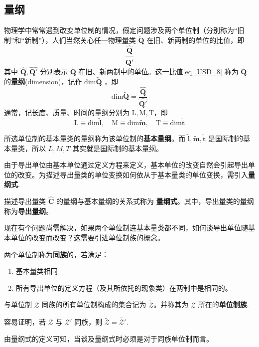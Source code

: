 \subsection{量纲}
物理学中常常遇到改变单位制的情况，假定问题涉及两个单位制（分别称为“旧制”和“新制”），人们当然关心任一物理量类 $\tilde{\boldsymbol{Q}}$ 在旧、新两制的单位的比值，即 
\begin{equation}\label{eq_USD_8}
\frac{\hat{\boldsymbol{Q}}}{\hat{\boldsymbol{Q'}}}
\end{equation}
其中 $\hat{\boldsymbol{Q}},\hat{\boldsymbol{Q'}}$ 分别表示 $\tilde{\boldsymbol{Q}}$ 在旧、新两制中的单位。这一比值\autoref{eq_USD_8} 称为 $\tilde{\boldsymbol{Q}}$ 的\textbf{量纲}(dimension)，记作 $\mathrm{dim}\tilde{\boldsymbol{Q}}$ ，即
\begin{equation}\label{eq_USD_9}
\mathrm{dim}\tilde{\boldsymbol{Q}}=\frac{\hat{\boldsymbol{Q}}}{\hat{\boldsymbol{Q'}}}
\end{equation}
通常，记长度、质量、时间的量纲分别为 $\mathrm{L},\mathrm{M},\mathrm{T}$，即
\begin{equation}
\mathrm{L}\equiv\mathrm{dim}\tilde{\boldsymbol{l}},\quad\mathrm{M}\equiv\mathrm{dim}\tilde{\boldsymbol{m}},\quad
\mathrm{T}\equiv\mathrm{dim}\tilde{\boldsymbol{t}}
\end{equation}

所选单位制的基本量类的量纲称为该单位制的\textbf{基本量纲}。而 $\tilde{\boldsymbol{l}},\tilde{\boldsymbol{m}},\tilde{\boldsymbol{t}}$ 是国际制的基本量类，所以 $L,M,T$ 其实就是国际制的基本量纲。

由于导出单位由基本单位通过定义方程来定义，基本单位的改变自然会引起导出单位的改变。为描述导出量类的单位变换如何依从于基本量类的单位变换，需引入\textbf{量纲式}.
\begin{definition}{}\label{def_USD_1}
描述导出量类 $\hat{\boldsymbol{C}}$ 的量纲与基本量纲的关系式称为 \textbf{量纲式}。其中，导出量类的量纲称为\textbf{导出量纲}。
\end{definition}

现在有个问题尚需解决，如果两个单位制连基本量类都不同，如何谈导出单位随基本单位的改变而改变？这需要引进单位制族的概念。
\begin{definition}{}\label{def_USD_2}
两个单位制称为\textbf{同族}的，若满足：
\begin{enumerate}
\item 基本量类相同 
\item 所有导出单位的定义方程（及其所依托的现象类）在两制中是相同的。
\end{enumerate}
\end{definition}
与单位制 $\mathscr{Z}$ 同族的所有单位制构成的集合记为 $\tilde{\mathscr{Z}}$。并称其为 $\mathscr{Z}$ 所在的\textbf{单位制族}.

容易证明，若 $\mathscr{Z}$ 与 $\mathscr{Z'}$ 同族，则 $\tilde{\mathscr{Z}}=\tilde{\mathscr{Z'}}$.

由量纲式的定义可知，当谈及量纲式时必须是对于同族单位制而言。